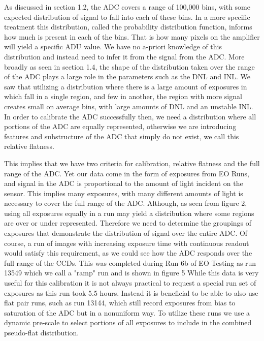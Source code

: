 \documentclass[11pt, letterpaper]{article}
\begin{document}
As discussed in section 1.2, the ADC covers a range of 100,000 bins, with some expected distribution of signal to fall into each of these bins. 
In a more specific treatment this distribution, called the probability distribution function, informs how much is present in each of the bins.
That is how many pixels on the amplifier will yield a specific ADU value.
We have no a-priori knowledge of this distribution and instead need to infer it from the signal from the ADC.
More broadly as seen in section 1.4, the shape of the distribution taken over the range of the ADC plays a large role in the parameters such as the DNL and INL.
We saw that utilizing a distribution where there is a large amount of exposures in which fall in a single region, and few in another, the region with more signal creates small on average bins, with large amounts of DNL and an unstable INL. 
In order to calibrate the ADC successfully then, we need a distribution where all portions of the ADC are equally represented, otherwise we are introducing features and substructure of the ADC that simply do not exist, we call this relative flatness. 
\indent 


This implies that we have two criteria for calibration, relative flatness and the full range of the ADC. 
Yet our data come in the form of exposures from EO Runs, and signal in the ADC is proportional to the amount of light incident on the sensor. 
This implies many exposures, with many different amounts of light is necessary to cover the full range of the ADC. 
Although, as seen from figure 2, using all exposures equally in a run may yield a distribution where some regions are over or under represented. 
Therefore we need to determine the groupings of exposures that demonstrate the distribution of signal over the entire ADC. 
Of course, a run of images with increasing exposure time with continuous readout would satisfy this requirement, as we could see how the ADC responds over the full range of the CCDs. 
This was completed during Run 6b of EO Testing as run 13549 which we call a "ramp" run and is shown in figure 5
While this data is very useful for this calibration it is not always practical to request a special run set of exposures as this run took 5.5 hours.
Instead it is beneficial to be able to also use flat pair runs, such as run 13144, which still record exposures from bias to saturation of the ADC but in a nonuniform way.
To utilize these runs we use a dynamic pre-scale to select portions of all exposures to include in the combined pseudo-flat distribution. 
\end{document}

